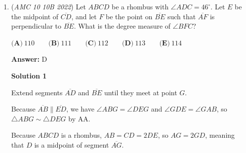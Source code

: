 \begin{enumerate}
 This gives $2$ valid configurations, counting rotations/reflections.

 Case 2: The center is initially empty.

 For the center to become filled, it must have exactly $3$ filled neighbors. There are several possible shapes for these three neighbors. Counting the configurations of each shape gives

 $4 + 4 + 4 + 8 = 20.$

 The total number of configurations is

 \begin{align*}2+4+4+4+8&=\boxed{22}.\end{align*}


 Therefore the answer is $\boxed{\textbf{(C)}\ 22}.$

 \href{https://artofproblemsolving.com/wiki/index.php?title=User:Lunar\_paradox&action=edit&redlink=1}{Lunar paradox} (\href{https://artofproblemsolving.com/wiki/index.php?title=User\_talk:Lunar\_paradox&action=edit&redlink=1}{talk}) 18:06, 24 August 2026 (EDT)

 \textbf{Remark} This problem is based off of Conway's Game of Life, a cellular automaton created by British mathematician John Conway in 1970. The game follows the exact same pattern of rules as this problem, but is played on an infinite grid of cells.

 


	\item (\textit{AMC 10 10B 2022}) Let $ABCD$ be a rhombus with $\angle{ADC} = 46^{\circ}$. Let $E$ be the midpoint of $\overline{CD}$, and let $F$ be the point on $\overline{BE}$ such that $\overline{AF}$ is perpendicular to $\overline{BE}$. What is the degree measure of $\angle{BFC}$?


 $\textbf{(A)}\ 110 \qquad \textbf{(B)}\ 111 \qquad \textbf{(C)}\ 112 \qquad \textbf{(D)}\ 113 \qquad \textbf{(E)}\ 114$

 \textbf{Answer: }D



\textbf{Solution 1}

Extend segments $\overline{AD}$ and $\overline{BE}$ until they meet at point $G$.

 Because $\overline{AB} \parallel \overline{ED}$, we have $\angle ABG = \angle DEG$ and $\angle GDE = \angle GAB$, so $\triangle ABG \sim \triangle DEG$ by AA.

 Because $ABCD$ is a rhombus, $AB = CD = 2DE$, so $AG = 2GD$, meaning that $D$ is a midpoint of segment $\overline{AG}$.


\end{enumerate}
